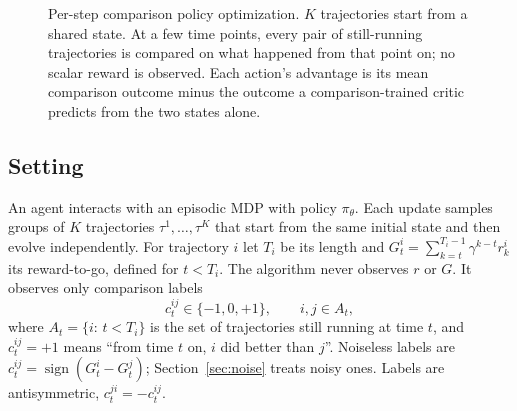 \documentclass[11pt]{article}
\theoremstyle{remark}
\newcommand{\sgn}{\operatorname{sign}}
\begin{document}
\begin{figure}[t]
\centering
{}
\caption{Per-step comparison policy optimization. $K$ trajectories start from a shared state. At a few time points, every pair of still-running trajectories is compared on what happened from that point on; no scalar reward is observed. Each action's advantage is its mean comparison outcome minus the outcome a comparison-trained critic predicts from the two states alone.}
\label{fig:method}
\end{figure}

\subsection{Setting}
An agent interacts with an episodic MDP with policy $\pi_\theta$. Each update samples groups of $K$ trajectories $\tau^1,\dots,\tau^K$ that start from the same initial state and then evolve independently. For trajectory $i$ let $T_i$ be its length and $G^i_t=\sum_{k=t}^{T_i-1}\gamma^{k-t}r^i_k$ its reward-to-go, defined for $t<T_i$. The algorithm never observes $r$ or $G$. It observes only comparison labels
\begin{equation}
c^{ij}_t \in \{-1,0,+1\}, \qquad i,j\in A_t,
\end{equation}
where $A_t=\{i:\,t<T_i\}$ is the set of trajectories still running at time $t$, and $c^{ij}_t=+1$ means ``from time $t$ on, $i$ did better than $j$''. Noiseless labels are $c^{ij}_t=\sgn(G^i_t-G^j_t)$; Section~\ref{sec:noise} treats noisy ones. Labels are antisymmetric, $c^{ji}_t=-c^{ij}_t$.
\end{document}
